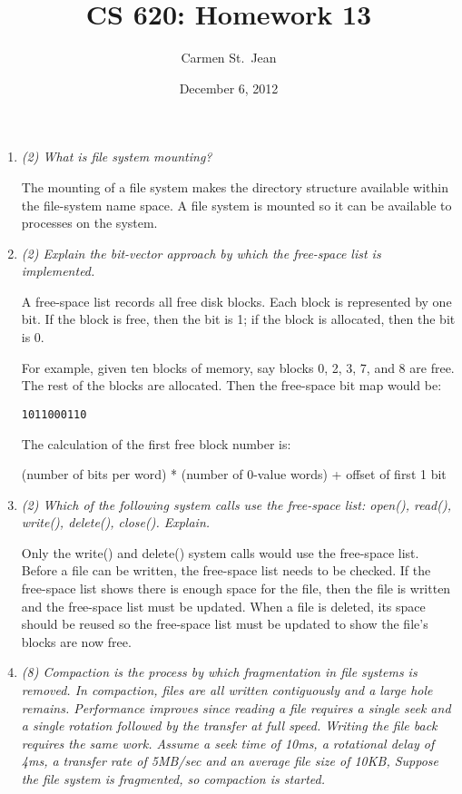 \documentclass[letterpaper,11pt]{article}
\begin{document}
\title{CS 620: Homework 13}
\date{December 6, 2012}
\author{Carmen St.\ Jean}

\maketitle

\begin{enumerate}
\item \emph{(2) What is file system mounting?}

The mounting of a file system makes the directory structure available within the file-system name space.  A file system is mounted so it can be available to processes on the system.
\item \emph{(2) Explain the bit-vector approach by which the free-space list is implemented.}

A free-space list records all free disk blocks.  Each block is represented by one bit.  If the block is free, then the bit is 1; if the block is allocated, then the bit is 0.

For example, given ten blocks of memory, say blocks 0, 2, 3, 7, and 8 are free.  The rest of the blocks are allocated.  Then the free-space bit map would be:

\begin{center}
\verb+1011000110+
\end{center}

The calculation of the first free block number is:

\begin{center}
(number of bits per word) * (number of 0-value words) + offset of first 1 bit
\end{center}
\item \emph{(2) Which of the following system calls use the free-space list: open(), read(), write(), delete(), close(). Explain.}

Only the write() and delete() system calls would use the free-space list.  Before a file can be written, the free-space list needs to be checked.  If the free-space list shows there is enough space for the file, then the file is written and the free-space list must be updated.  When a file is deleted, its space should be reused so the free-space list must be updated to show the file's blocks are now free.
\item \emph{(8) Compaction is the process by which fragmentation in file systems is removed. In compaction, files are all written contiguously and a large hole remains. Performance improves since reading a file requires a single seek and a single rotation followed by the transfer at full speed. Writing the file back requires the same work. Assume a seek time of 10ms, a rotational delay of 4ms, a transfer rate of 5MB/sec and an average ﬁle size of 10KB, Suppose the ﬁle system is fragmented, so compaction is started.}


\end{enumerate}
\end{document}
